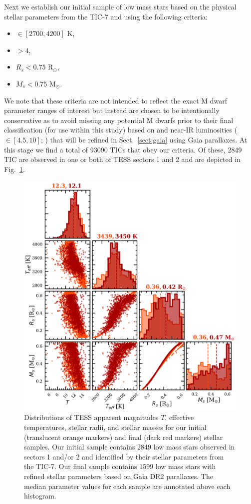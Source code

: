 Next we establish our initial sample of low mass stars based on the physical stellar parameters from the
TIC-7 and using the following criteria:

\begin{itemize}
\item \teff{} $\in [2700,4200]$ K,
\item \logg{} $>4$,
\item $R_s < 0.75$ R$_{\odot}$,
\item $M_s < 0.75$ M$_{\odot}$.
\end{itemize}

\noindent We note that these criteria are not intended to reflect the exact M dwarf parameter ranges of
interest but instead are chosen to be intentionally conservative as to avoid missing any potential
M dwarfs prior to their final classification (for use within this study) based on \teff{} and 
near-IR luminosities  (\MK{} $\in [4.5,10]$; \citealt{delfosse00, benedict16}) that will be refined
in Sect.~\ref{sect:gaia} using Gaia parallaxes.
At this stage we find a total of 93090 TICs that obey our criteria. Of these, 2849 TIC are observed in
one or both of TESS sectors 1 and 2 and are depicted in Fig.~\ref{fig:stars}.

\begin{figure}
  \centering
  \includegraphics[width=0.9\hsize]{figures/stellar_corner.png}
  \caption[Stellar parameters for M dwarf TICs in TESS sectors 1 and 2.]
    {Distributions of TESS apparent magnitudes $T$, effective temperatures,
    stellar radii, and stellar masses for our initial (translucent orange markers) and final
    (dark red markers) stellar samples. Our initial sample contains 2849 low mass stars observed in
    sectors 1 and/or 2 and identified by their stellar parameters from the TIC-7. Our final sample contains
    1599 low mass stars with refined stellar parameters based on Gaia
    DR2 parallaxes. The median parameter values for each sample are annotated above each histogram.}
  \label{fig:stars}
\end{figure}
  

